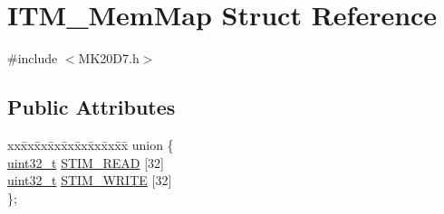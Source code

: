 \hypertarget{struct_i_t_m___mem_map}{}\section{I\+T\+M\+\_\+\+Mem\+Map Struct Reference}
\label{struct_i_t_m___mem_map}


{\ttfamily \#include $<$M\+K20\+D7.\+h$>$}

\subsection*{Public Attributes}
\begin{DoxyCompactItemize}
\item 
\begin{tabbing}
xx\=xx\=xx\=xx\=xx\=xx\=xx\=xx\=xx\=\kill
union \{\\
\>\hyperlink{_p_e___types_8h_a33594304e786b158f3fb30289278f5af}{uint32\_t} \hyperlink{struct_i_t_m___mem_map_afb3f200b95047ddd2dc4b045887ebfa3}{STIM\_READ} \mbox{[}32\mbox{]}\\
\>\hyperlink{_p_e___types_8h_a33594304e786b158f3fb30289278f5af}{uint32\_t} \hyperlink{struct_i_t_m___mem_map_a0ba1ca981edcde8bf08accc593fa1f52}{STIM\_WRITE} \mbox{[}32\mbox{]}\\
\}; \\


\end{tabbing}
\end{DoxyCompactItemize}
